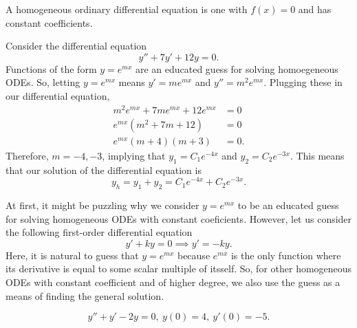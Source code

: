 \begin{definition}
    A \alert{homogeneous} ordinary differential equation is one with $f(x) = 0$ 
    and has constant coefficients.
\end{definition}
\begin{example}
    Consider the differential equation $$y''+7y'+12y=0.$$ Functions of the
    form $y=e^{mx}$ are an educated guess for solving homoegeneous ODEs. So,
    letting $y=e^{mx}$ means $y' = me^{mx}$ and $y''= m^2e^{mx}$. Plugging
    these in our differential equation,
    \begin{align*}
        m^2e^{mx}+7me^{mx}+12e^{mx}&=0 \\
        e^{mx}\left(m^2+7m+12\right)&=0 \\
        e^{mx}(m+4)(m+3) &= 0.
    \end{align*}
    Therefore, $m=-4,-3$, implying that $y_1=C_1e^{-4x}$ and $y_2=C_2e^{-3x}$. 
    This means that our solution of the differential
    equation is $$y_h = y_1+y_2 =  C_1e^{-4x} + C_2e^{-3x}.$$
\end{example}
At first, it might be puzzling why we consider $y=e^{mx}$ to be an educated
guess for solving homogeneous ODEs with constant coeficients. However, let us
consider the following first-order differential equation 
$$y'+ky=0 \implies y' = -ky.$$ Here, it is natural to guess that $y=e^{mx}$
because $e^{mx}$ is the only function where its derivative is equal to some
scalar multiple of itsself. So, for other homogeneous ODEs with constant
coefficient and of higher degree, we also use the guess as a means
of finding the general solution.
\begin{exercise}
    $$y''+y'-2y=0,~y(0) = 4,~y'(0)=-5.$$
\end{exercise}
